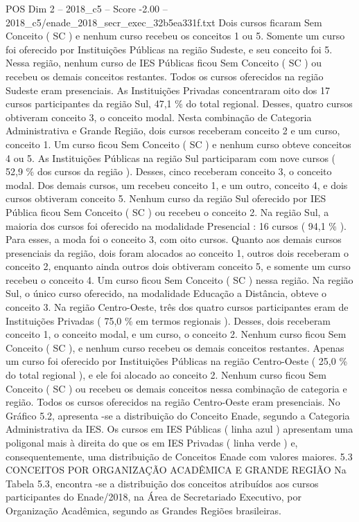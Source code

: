 \begin{textsample}{POS Dim 2 – 2018\_c5 – Score -2.00 – 2018\_c5/enade\_2018\_secr\_exec\_32b5ea331f.txt}
Dois cursos ficaram Sem Conceito ( SC ) e nenhum curso recebeu os conceitos 1 ou 5.
Somente um curso foi oferecido por Instituições Públicas na região Sudeste, e seu conceito foi 5.
Nessa região, nenhum curso de IES Públicas ficou Sem Conceito ( SC ) ou recebeu os demais conceitos restantes.
Todos os cursos oferecidos na região Sudeste eram presenciais.
As Instituições Privadas concentraram oito dos 17 cursos participantes da região Sul, 47,1 \% do total regional.
Desses, quatro cursos obtiveram conceito 3, o conceito modal.
Nesta combinação de Categoria Administrativa e Grande Região, dois cursos receberam conceito 2 e um curso, conceito 1.
Um curso ficou Sem Conceito ( SC ) e nenhum curso obteve conceitos 4 ou 5.
As Instituições Públicas na região Sul participaram com nove cursos ( 52,9 \% dos cursos da região ).
Desses, cinco receberam conceito 3, o conceito modal.
Dos demais cursos, um recebeu conceito 1, e um outro, conceito 4, e dois cursos obtiveram conceito 5.
Nenhum curso da região Sul oferecido por IES Pública ficou Sem Conceito ( SC ) ou recebeu o conceito 2.
Na região Sul, a maioria dos cursos foi oferecido na modalidade Presencial : 16 cursos ( 94,1 \% ).
Para esses, a moda foi o conceito 3, com oito cursos.
Quanto aos demais cursos presenciais da região, dois foram alocados ao conceito 1, outros dois receberam o conceito 2, enquanto ainda outros dois obtiveram conceito 5, e somente um curso recebeu o conceito 4.
Um curso ficou Sem Conceito ( SC ) nessa região.
Na região Sul, o único curso oferecido, na modalidade Educação a Distância, obteve o conceito 3.
Na região Centro-Oeste, três dos quatro cursos participantes eram de Instituições Privadas ( 75,0 \% em termos regionais ).
Desses, dois receberam conceito 1, o conceito modal, e um curso, o conceito 2.
Nenhum curso ficou Sem Conceito ( SC ), e nenhum curso recebeu os demais conceitos restantes.
Apenas um curso foi oferecido por Instituições Públicas na região Centro-Oeste ( 25,0 \% do total regional ), e ele foi alocado ao conceito 2.
Nenhum curso ficou Sem Conceito ( SC ) ou recebeu os demais conceitos nessa combinação de categoria e região.
Todos os cursos oferecidos na região Centro-Oeste eram presenciais.
No Gráfico 5.2, apresenta -se a distribuição do Conceito Enade, segundo a Categoria Administrativa da IES.
Os cursos em IES Públicas ( linha azul ) apresentam uma poligonal mais à direita do que os em IES Privadas ( linha verde ) e, consequentemente, uma distribuição de Conceitos Enade com valores maiores. 5.3 CONCEITOS POR ORGANIZAÇÃO ACADÊMICA E GRANDE REGIÃO Na Tabela 5.3, encontra -se a distribuição dos conceitos atribuídos aos cursos participantes do Enade/2018, na Área de Secretariado Executivo, por Organização Acadêmica, segundo as Grandes Regiões brasileiras.

\end{textsample}
